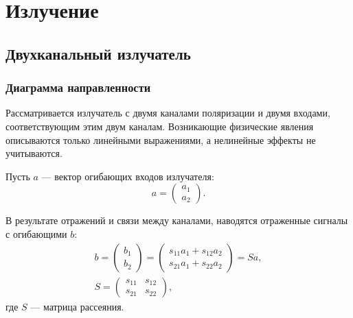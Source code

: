 \chapter{Излучение}


\section{Двухканальный излучатель}

\subsection{Диаграмма направленности}

Рассматривается излучатель с двумя каналами поляризации и двумя входами, соответствующим этим двум каналам. Возникающие физические явления описываются только
линейными выражениями, а нелинейные эффекты не учитываются.

Пусть $a$ --- вектор огибающих входов излучателя:
\[
    a
    = \begin{pmatrix}
          a_1 \\
          a_2
    \end{pmatrix} .
\]

В результате отражений и связи между каналами, наводятся отраженные сигналы с огибающими $b$:
\begin{gather*}
    b
    = \begin{pmatrix}
          b_1 \\
          b_2
    \end{pmatrix}
    = \begin{pmatrix}
          s_{11} a_1 + s_{12} a_2 \\
          s_{21} a_1 + s_{22} a_2
    \end{pmatrix}
    = S a, \\
    S
    = \begin{pmatrix}
          s_{11} & s_{12} \\
          s_{21} & s_{22}
    \end{pmatrix},
\end{gather*}
где $S$ --- матрица рассеяния.

